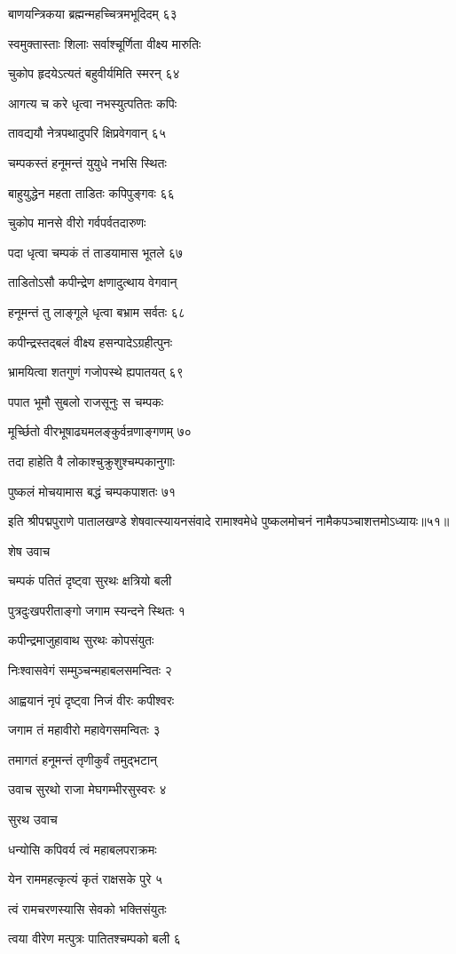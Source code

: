 बाणयन्त्रिकया ब्रह्मन्महच्चित्रमभूदिदम् ६३

स्वमुक्तास्ताः शिलाः सर्वाश्चूर्णिता वीक्ष्य मारुतिः

चुकोप हृदयेऽत्यतं बहुवीर्यमिति स्मरन् ६४

आगत्य च करे धृत्वा नभस्युत्पतितः कपिः

तावद्ययौ नेत्रपथादुपरि क्षिप्रवेगवान् ६५

चम्पकस्तं हनूमन्तं युयुधे नभसि स्थितः

बाहुयुद्धेन महता ताडितः कपिपुङ्गवः ६६

चुकोप मानसे वीरो गर्वपर्वतदारुणः

पदा धृत्वा चम्पकं तं ताडयामास भूतले ६७

ताडितोऽसौ कपीन्द्रेण क्षणादुत्थाय वेगवान्

हनूमन्तं तु लाङ्गूले धृत्वा बभ्राम सर्वतः ६८

कपीन्द्रस्तद्बलं वीक्ष्य हसन्पादेऽग्रहीत्पुनः

भ्रामयित्वा शतगुणं गजोपस्थे ह्यपातयत् ६९

पपात भूमौ सुबलो राजसूनुः स चम्पकः

मूर्च्छितो वीरभूषाढ्यमलङ्कुर्वन्रणाङ्गणम् ७०

तदा हाहेति वै लोकाश्चुक्रुशुश्चम्पकानुगाः

पुष्कलं मोचयामास बद्धं चम्पकपाशतः ७१

इति श्रीपद्मपुराणे पातालखण्डे शेषवात्स्यायनसंवादे रामाश्वमेधे पुष्कलमोचनं नामैकपञ्चाशत्तमोऽध्यायः॥५१॥


शेष उवाच

चम्पकं पतितं दृष्ट्वा सुरथः क्षत्रियो बली

पुत्रदुःखपरीताङ्गो जगाम स्यन्दने स्थितः १

कपीन्द्रमाजुहावाथ सुरथः कोपसंयुतः

निःश्वासवेगं सम्मुञ्चन्महाबलसमन्वितः २

आह्वयानं नृपं दृष्ट्वा निजं वीरः कपीश्वरः

जगाम तं महावीरो महावेगसमन्वितः ३

तमागतं हनूमन्तं तृणीकुर्वं तमुद्भटान्

उवाच सुरथो राजा मेघगम्भीरसुस्वरः ४

सुरथ उवाच

धन्योसि कपिवर्य त्वं महाबलपराक्रमः

येन राममहत्कृत्यं कृतं राक्षसके पुरे ५

त्वं रामचरणस्यासि सेवको भक्तिसंयुतः

त्वया वीरेण मत्पुत्रः पातितश्चम्पको बली ६

